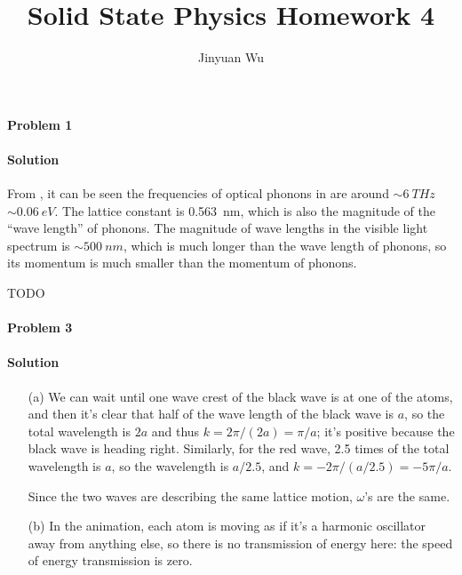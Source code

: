 \documentclass[hyperref, a4paper]{article}
\title{Solid State Physics Homework 4}
\author{Jinyuan Wu}
\begin{document}
\maketitle

\paragraph{Problem 1}

\paragraph{Solution} From \cite{messaoudi2015band},
it can be seen the frequencies of optical phonons in  are around $\sim \SI{6}{THz}$
$\sim \SI{0.06}{eV}$.
The lattice constant is \SI{0.563}{nm},
which is also the magnitude of the ``wave length'' of phonons.
The magnitude of wave lengths in the visible light spectrum is $\sim \SI{500}{nm}$,
which is much longer than the wave length of phonons, 
so its momentum is much smaller than the momentum of phonons.

TODO

\paragraph{Problem 3} 

\paragraph{Solution}

\begin{itemize}
\item[(a)] We can wait until one wave crest of the black wave is at one of the atoms,
and then it's clear that half of the wave length of the black wave is $a$,
so the total wavelength is $2a$ and thus $k = 2\pi / (2a) = \pi / a$;
it's positive because the black wave is heading right.
Similarly, for the red wave, 
2.5 times of the total wavelength is $a$, so the wavelength is $a / 2.5$,
and $k = - 2\pi / (a / 2.5) = - 5 \pi / a$.

Since the two waves are describing the same lattice motion,
$\omega$'s are the same.

\item[(b)] In the animation, 
each atom is moving as if it's a harmonic oscillator away from anything else,
so there is no transmission of energy here:
the speed of energy transmission is zero.
\end{itemize}
\end{document}
